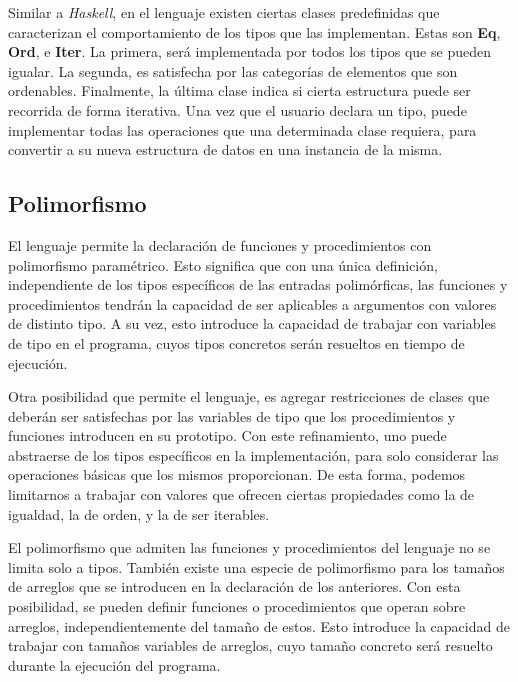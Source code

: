Similar a \textit{Haskell}, en el lenguaje existen ciertas clases predefinidas que caracterizan el comportamiento de los tipos que las implementan.
Estas son \textbf{Eq}, \textbf{Ord}, e \textbf{Iter}.
La primera, será implementada por todos los tipos que se pueden igualar.
La segunda, es satisfecha por las categorías de elementos que son ordenables.
Finalmente, la última clase indica si cierta estructura puede ser recorrida de forma iterativa.
Una vez que el usuario declara un tipo, puede implementar todas las operaciones que una determinada clase requiera, para convertir a su nueva estructura de datos en una instancia de la misma.


\subsection{Polimorfismo}

El lenguaje permite la declaración de funciones y procedimientos con polimorfismo paramétrico.
Esto significa que con una única definición, independiente de los tipos específicos de las entradas polimórficas, las funciones y procedimientos tendrán la capacidad de ser aplicables a argumentos con valores de distinto tipo.
A su vez, esto introduce la capacidad de trabajar con variables de tipo en el programa, cuyos tipos concretos serán resueltos en tiempo de ejecución.

Otra posibilidad que permite el lenguaje, es agregar restricciones de clases que deberán ser satisfechas por las variables de tipo que los procedimientos y funciones introducen en su prototipo.
Con este refinamiento, uno puede abstraerse de los tipos específicos en la implementación, para solo considerar las operaciones básicas que los mismos proporcionan.
De esta forma, podemos limitarnos a trabajar con valores que ofrecen ciertas propiedades como la de igualdad, la de orden, y la de ser iterables.

El polimorfismo que admiten las funciones y procedimientos del lenguaje no se limita solo a tipos.
También existe una especie de polimorfismo para los tamaños de arreglos que se introducen en la declaración de los anteriores.
Con esta posibilidad, se pueden definir funciones o procedimientos que operan sobre arreglos, independientemente del tamaño de estos.
Esto introduce la capacidad de trabajar con tamaños variables de arreglos, cuyo tamaño concreto será resuelto durante la ejecución del programa.

